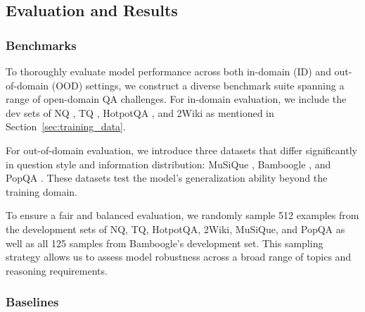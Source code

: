 \documentclass{article}
\begin{document}
\subsection{Evaluation and Results}

\subsubsection{Benchmarks}

To thoroughly evaluate model performance across both in-domain (ID) and out-of-domain (OOD) settings, we construct a diverse benchmark suite spanning a range of open-domain QA challenges. For in-domain evaluation, we include the dev sets of NQ \cite{kwiatkowski-etal-2019-natural}, TQ \cite{joshi-etal-2017-triviaqa}, HotpotQA \cite{yang2018hotpotqa}, and 2Wiki \cite{xanh2020_2wikimultihop} as mentioned in Section~\ref{sec:training_data}.

For out-of-domain evaluation, we introduce three datasets that differ significantly in question style and information distribution: MuSiQue \cite{trivedi2021musique}, Bamboogle \cite{press2022measuring}, and PopQA \cite{mallen2023llm_memorization}. These datasets test the model’s generalization ability beyond the training domain.

To ensure a fair and balanced evaluation, we randomly sample 512 examples from the development sets of NQ, TQ, HotpotQA, 2Wiki, MuSiQue, and PopQA as well as all 125 samples from Bamboogle's development set. This sampling strategy allows us to assess model robustness across a broad range of topics and reasoning requirements.


\subsubsection{Baselines}
\end{document}
